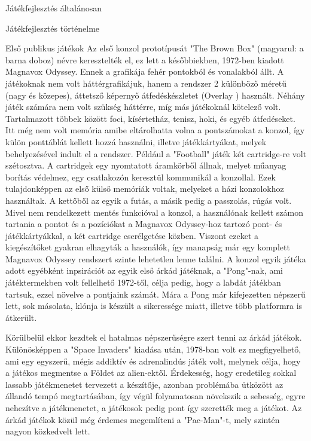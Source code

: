\begin{MyChapter}{Játékfejlesztés általánosan}
\begin{MySection}{Játékfejlesztés történelme}
\begin{MySubSection}{Első publikus játékok}
		Az első konzol prototípusát "The Brown Box" (magyarul: a barna doboz) névre keresztelték el, ez lett a későbbiekben, 1972-ben kiadott Magnavox Odyssey. Ennek a grafikája fehér pontokból és vonalakból állt. A játékoknak nem volt háttérgrafikájuk, hanem a rendszer 2 különböző méretű (nagy és közepes), áttetsző képernyő átfedéskészletet (Overlay%
		) használt. Néhány játék számára nem volt szükség háttérre, míg más játékoknál kötelező volt. Tartalmazott többek között foci, kísértetház, tenisz, hoki, és egyéb átfedéseket. Itt még nem volt memória amibe eltárolhatta volna a pontszámokat a konzol, így külön ponttáblát kellett hozzá használni, illetve játékkártyákat, melyek behelyezésével indult el a rendszer. Például a "Football" játék két cartridge-re volt szétosztva. A cartridgek egy nyomtatott áramkörből állnak, melyet műanyag borítás védelmez, egy csatlakozón keresztül kommunikál a konzollal. Ezek tulajdonképpen az első külső memóriák voltak, melyeket a házi konzolokhoz használtak. A kettőből az egyik a futás, a másik pedig a passzolás, rúgás volt. Mivel nem rendelkezett mentés funkcióval a konzol, a használónak kellett számon tartania a pontot és a pozíciókat a Magnavox Odyssey-hoz tartozó pont- és játékkártyákkal, a két cartridge cserélgetése közben. Viszont ezeket a kiegészítőket gyakran elhagyták a használók, így manapság már egy komplett Magnavox Odyssey rendszert szinte lehetetlen lenne találni. A konzol egyik játéka adott egyébként inpsirációt az egyik első árkád játéknak, a "Pong"-nak, ami játéktermekben volt fellelhető 1972-től, célja pedig, hogy a labdát játékban tartsuk, ezzel növelve a pontjaink számát. Mára a Pong már kifejezetten népszerű lett, sok másolata, klónja is készült a sikeressége miatt, illetve több platformra is átkerült.
		
		
		Körülbelül ekkor kezdtek el hatalmas népszerűségre szert tenni az árkád játékok. Különösképpen a "Space Invaders" kiadása után, 1978-ban volt ez megfigyelhető, ami egy egyszerű, mégis addiktív és adrenalindús játék volt, melynek célja, hogy a játékos megmentse a Földet az alien-ektől. Érdekesség, hogy eredetileg sokkal lassabb játékmenetet tervezett a készítője, azonban problémába ütközött az állandó tempó megtartásában, így végül folyamatosan növekszik a sebesség, egyre nehezítve a játékmenetet, a játékosok pedig pont így szerették meg a játékot. Az árkád játékok közül még érdemes megemlíteni a "Pac-Man"-t, mely szintén nagyon közkedvelt lett.


\end{MySubSection}
\end{MySection}
\end{MyChapter}
